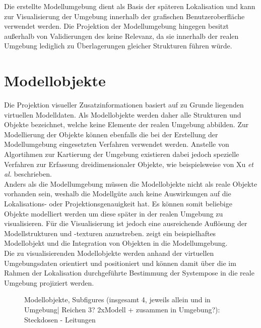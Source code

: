 Die erstellte Modellumgebung dient als Basis der späteren Lokalisation und kann zur Visualisierung der Umgebung innerhalb der grafischen Benutzeroberfläche verwendet werden. Die Projektion der Modellumgebung hingegen besitzt außerhalb von Validierungen des  keine Relevanz, da sie innerhalb der realen Umgebung lediglich zu Überlagerungen gleicher Strukturen führen würde.\\

\section{Modellobjekte}
Die Projektion visueller Zusatzinformationen basiert auf zu Grunde liegenden virtuellen Modelldaten. Als Modellobjekte werden daher alle Strukturen und Objekte bezeichnet, welche keine Elemente der realen Umgebung abbilden. Zur Modellierung der Objekte können ebenfalls die bei der Erstellung der Modellumgebung eingesetzten Verfahren verwendet werden. Anstelle von Algortihmen zur Kartierung der Umgebung existieren dabei jedoch spezielle Verfahren zur Erfassung dreidimensionaler Objekte, wie beispielsweise von Xu \textit{et al.} \cite{Xu2012} beschrieben.\\

Anders als die Modellumgebung müssen die Modellobjekte nicht als reale Objekte vorhanden sein, weshalb die Modellgüte auch keine Auswirkungen auf die Lokalisations- oder Projektionsgenauigkeit hat. Es können somit beliebige Objekte modelliert werden um diese später in der realen Umgebung zu visualisieren.  Für die Visualisierung ist jedoch eine ausreichende Auflösung der Modellstrukturen und -texturen anzustreben.  zeigt ein beispielhaftes Modellobjekt und die Integration von Objekten in die Modellumgebung.\\
Die zu visualisierenden Modellobjekte werden anhand der virtuellen Umgebungsdaten orientiert und positioniert und können damit über die im Rahmen der Lokalisation durchgeführte Bestimmung der Systempose in die reale Umgebung projiziert werden.\\

\begin{figure}[ht]
	\begin{center}
	\hspace{3mm}
	\caption{Modellobjekte, Subfigures (insgesamt 4, jeweils allein und in Umgebung| Reichen 3? 2xModell + zusammen in Umgebung?): Steckdosen - Leitungen}
	\label{fig.modobj}
	\end{center}
\end{figure}

